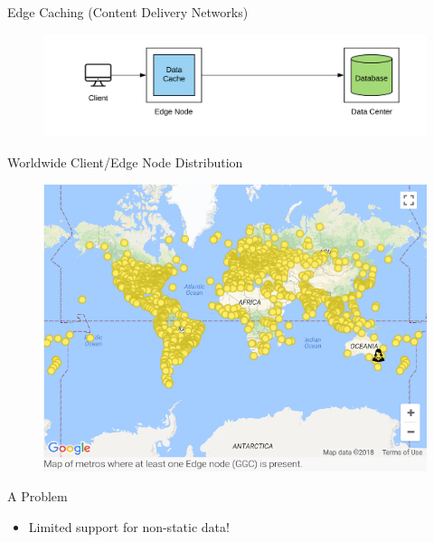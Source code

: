 \documentclass[10pt]{beamer}
\begin{document}
\begin{frame}{Edge Caching (Content Delivery Networks)}
    \begin{figure}
        \center
        \hspace*{-1.5cm}
        \includegraphics[scale=0.17]{apollo_edge_cache}
    \end{figure}
\end{frame}

\begin{frame}{Worldwide Client/Edge Node Distribution}
    \begin{figure}
        \center
        \includegraphics[scale=0.45]{apollo_google_oceania_en}
    \end{figure}
\end{frame}

\begin{frame}{A Problem}
    \begin{itemize}
        \item{Limited support for non-static data!}
    \end{itemize}
    \vspace{1cm}
\end{frame}
\end{document}

